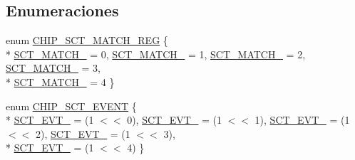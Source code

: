 \subsection*{Enumeraciones}
\begin{DoxyCompactItemize}
\item 
enum \hyperlink{group___s_c_t__18_x_x__43_x_x_ga642884ed46b523a1106a6505950e0259}{C\+H\+I\+P\+\_\+\+S\+C\+T\+\_\+\+M\+A\+T\+C\+H\+\_\+\+R\+EG} \{ \\*
\hyperlink{group___s_c_t__18_x_x__43_x_x_gga642884ed46b523a1106a6505950e0259ac6cb24d0ff2cfc2231012b107e47c52b}{S\+C\+T\+\_\+\+M\+A\+T\+C\+H\+\_} = 0, 
\hyperlink{group___s_c_t__18_x_x__43_x_x_gga642884ed46b523a1106a6505950e0259aaa48fc9446e3eb3866a1af078395e32e}{S\+C\+T\+\_\+\+M\+A\+T\+C\+H\+\_} = 1, 
\hyperlink{group___s_c_t__18_x_x__43_x_x_gga642884ed46b523a1106a6505950e0259a4558102c150458c007cb5764e3b875dd}{S\+C\+T\+\_\+\+M\+A\+T\+C\+H\+\_} = 2, 
\hyperlink{group___s_c_t__18_x_x__43_x_x_gga642884ed46b523a1106a6505950e0259a37d0cb43a4c9dc34fd618481c82dfe87}{S\+C\+T\+\_\+\+M\+A\+T\+C\+H\+\_} = 3, 
\\*
\hyperlink{group___s_c_t__18_x_x__43_x_x_gga642884ed46b523a1106a6505950e0259a0657c7533d077e5d62fd606194ecba9c}{S\+C\+T\+\_\+\+M\+A\+T\+C\+H\+\_} = 4
 \}
\item 
enum \hyperlink{group___s_c_t__18_x_x__43_x_x_gae9508d79393246da4eda561eff0ec9e3}{C\+H\+I\+P\+\_\+\+S\+C\+T\+\_\+\+E\+V\+E\+NT} \{ \\*
\hyperlink{group___s_c_t__18_x_x__43_x_x_ggae9508d79393246da4eda561eff0ec9e3a8a0bfbbbc53a1205d0335107ed6808b8}{S\+C\+T\+\_\+\+E\+V\+T\+\_} = (1 $<$$<$ 0), 
\hyperlink{group___s_c_t__18_x_x__43_x_x_ggae9508d79393246da4eda561eff0ec9e3af3604a2acb3d8a5252a0407ab7268d6b}{S\+C\+T\+\_\+\+E\+V\+T\+\_} = (1 $<$$<$ 1), 
\hyperlink{group___s_c_t__18_x_x__43_x_x_ggae9508d79393246da4eda561eff0ec9e3a0d5d758fcfefe261e412bb195d751c6a}{S\+C\+T\+\_\+\+E\+V\+T\+\_} = (1 $<$$<$ 2), 
\hyperlink{group___s_c_t__18_x_x__43_x_x_ggae9508d79393246da4eda561eff0ec9e3a762687c115dad59a64e94b446ce1f179}{S\+C\+T\+\_\+\+E\+V\+T\+\_} = (1 $<$$<$ 3), 
\\*
\hyperlink{group___s_c_t__18_x_x__43_x_x_ggae9508d79393246da4eda561eff0ec9e3a0d6ff541bc71df7ebf920909acc7e7d5}{S\+C\+T\+\_\+\+E\+V\+T\+\_} = (1 $<$$<$ 4)
 \}
\end{DoxyCompactItemize}
